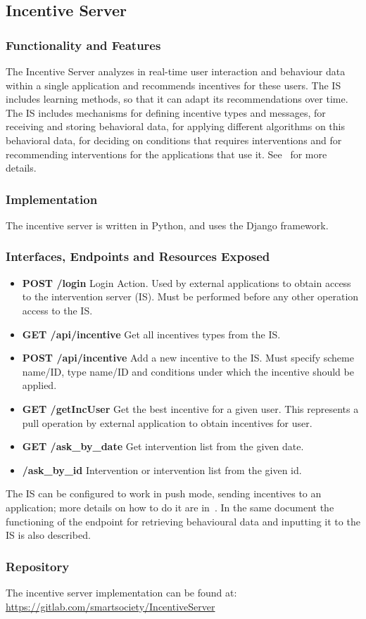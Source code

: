 \subsection{Incentive Server}
\subsubsection{Functionality and Features}
The Incentive Server analyzes in real-time user interaction and behaviour data within a single application and recommends incentives for these  users. The IS includes learning methods, so that it can adapt its recommendations over time. The IS includes mechanisms for defining  incentive types and messages, for receiving and storing behavioral data, for applying different  algorithms on this behavioral data, for deciding on conditions that requires interventions and for  recommending interventions for the applications that use it. See~\cite{D5.4} for more details.
\subsubsection{Implementation}
The incentive server is written in Python, and uses the Django framework. 
\subsubsection{Interfaces, Endpoints and Resources Exposed}
\begin{itemize}
\item {\bf POST /login} Login Action. Used by external applications to obtain access to the intervention server (IS). Must be performed before any other operation access to the IS.
\item {\bf GET /api/incentive} Get all incentives types from the IS.
\item {\bf POST /api/incentive} Add a new incentive to the IS. Must specify scheme name/ID, type name/ID and conditions under which the incentive should be applied.
\item {\bf GET /getIncUser} Get the best incentive for a given user. This represents a pull operation by external application to obtain incentives for user.
\item {\bf GET /ask\_by\_date}  Get intervention list from the given date.  
\item {\bf /ask\_by\_id} Intervention or intervention list from the given id. 
\end{itemize}
The IS can be configured to work in push mode, sending incentives to an application; more details on how to do it are in~\cite{D5.4}. In the same document the functioning of the endpoint for retrieving behavioural data and inputting it to the IS is also described.
\subsubsection{Repository}
The incentive server implementation can be found at: \url{https://gitlab.com/smartsociety/IncentiveServer}
